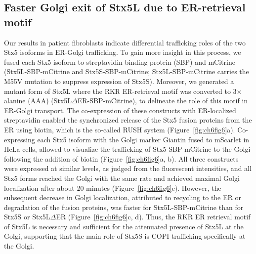 \subsection{Faster Golgi exit of Stx5L due to ER-retrieval motif}

Our results in patient fibroblasts indicate differential trafficking roles of the two Stx5 isoforms in ER-Golgi trafficking. To gain more insight in this process, we fused each Stx5 isoform to streptavidin-binding protein (SBP) and mCitrine (Stx5L-SBP-mCitrine and Stx5S-SBP-mCitrine; Stx5L-SBP-mCitrine carries the M55V mutation to suppress expression of Stx5S). Moreover, we generated a mutant form of Stx5L where the RKR ER-retrieval motif was converted to 3$\times$ alanine (AAA) (Stx5L$\Delta$ER-SBP-mCitrine)\cite{hui_isoform_1997}, to delineate the role of this motif in ER-Golgi transport. The co-expression of these constructs with ER-localized streptavidin enabled the synchronized release of the Stx5 fusion proteins from the ER using biotin, which is the so-called RUSH system\cite{boncompain_synchronization_2012} (Figure~\ref{fig:ch6fig6}a). Co-expressing each Stx5 isoform with the Golgi marker Giantin fused to mScarlet\cite{bindels_mscarlet:_2017} in HeLa cells, allowed to visualize the trafficking of Stx5-SBP-mCitrine to the Golgi following the addition of biotin (Figure~\ref{fig:ch6fig6}a, b). All three constructs were expressed at similar levels, as judged from the fluorescent intensities, and all Stx5 forms reached the Golgi with the same rate and achieved maximal Golgi localization after about 20 minutes (Figure~\ref{fig:ch6fig6}c). However, the subsequent decrease in Golgi localization, attributed to recycling to the ER or degradation of the fusion proteins, was faster for Stx5L-SBP-mCitrine than for Stx5S or Stx5L$\Delta$ER (Figure~\ref{fig:ch6fig6}c, d). Thus, the RKR ER retrieval motif of Stx5L is necessary and sufficient for the attenuated presence of Stx5L at the Golgi, supporting that the main role of Stx5S is COPI trafficking specifically at the Golgi.

